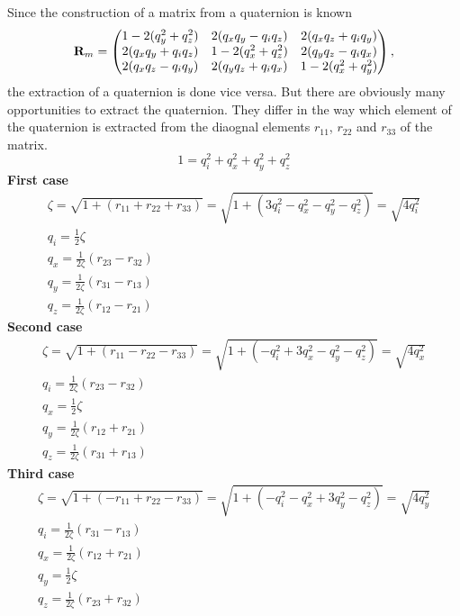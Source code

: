 Since the construction of a matrix from a quaternion is known
\begin{equation}
\mathbf{R}_m = \begin{pmatrix}
1-2(q_y^2 + q_z^2)		& 2(q_xq_y-q_iq_z)		& 2(q_xq_z + q_iq_y) \\
2(q_xq_y + q_iq_z)		& 1-2(q_x^2 + q_z^2)	& 2(q_yq_z - q_iq_x) \\
2(q_xq_z - q_iq_y)		& 2(q_yq_z+q_iq_x)		& 1-2(q_x^2 + q_y^2)	
\end{pmatrix},
\end{equation}
the extraction of a quaternion is done vice versa. But there are obviously many opportunities to extract the quaternion. They differ in the way which element of the quaternion is extracted from the diaognal elements $r_{11}$, $r_{22}$ and $r_{33}$  of the matrix.
\begin{equation}
1 = q_i^2+q_x^2+q_y^2+q_z^2
\end{equation}
\textbf{First case}
\begin{eqnarray}
\zeta = \sqrt{1 + (r_{11}+r_{22}+r_{33})}  =  \sqrt{1 + (3q_i^2 -q_x^2 -q_y^2 -q_z^2)} = \sqrt{4 q_i^2} \\
q_i = \tfrac 1 2 \zeta \\
q_x =  \tfrac 1 {2 \zeta} (r_{23}-r_{32}) \\
q_y =  \tfrac 1 {2 \zeta} (r_{31}-r_{13}) \\
q_z =  \tfrac 1 {2 \zeta} (r_{12}-r_{21})
\end{eqnarray}
\textbf{Second case}
\begin{eqnarray}
\zeta = \sqrt{1 + (r_{11}-r_{22}-r_{33})}  =  \sqrt{1 + (-q_i^2+3q_x^2 -q_y^2 -q_z^2)} = \sqrt{4 q_x^2} \\
q_i =  \tfrac 1 {2 \zeta} (r_{23}-r_{32}) \\
q_x = \tfrac 1 2 \zeta \\
q_y =  \tfrac 1 {2 \zeta} (r_{12}+r_{21}) \\
q_z =  \tfrac 1 {2 \zeta} (r_{31}+r_{13})
\end{eqnarray}
\textbf{Third case}
\begin{eqnarray}
\zeta = \sqrt{1 + (-r_{11}+r_{22}-r_{33})}  =  \sqrt{1 + (-q_i^2 -q_x^2+3q_y^2 -q_z^2)} = \sqrt{4 q_y^2} \\
q_i =  \tfrac 1 {2 \zeta} (r_{31}-r_{13}) \\
q_x =  \tfrac 1 {2 \zeta} (r_{12}+r_{21}) \\
q_y = \tfrac 1 2 \zeta \\
q_z =  \tfrac 1 {2 \zeta} (r_{23}+r_{32})
\end{eqnarray}
